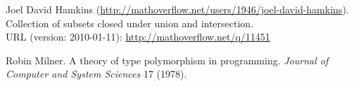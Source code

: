 \begin{thebibliography}{99}
Joel David Hamkins
(\hbox{\url{http://mathoverflow.net/users/1946/joel-david-hamkins}}).\\
Collection of subsets closed under union and intersection.\\
URL (version: 2010-01-11): \hbox{\url{http://mathoverflow.net/q/11451}}

Robin Milner.
A theory of type polymorphism in programming.
\emph{Journal of Computer and System Sciences} 17 (1978).
\end{thebibliography}
